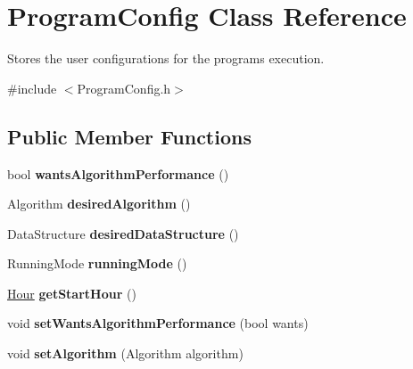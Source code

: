 \hypertarget{class_program_config}{}\section{Program\+Config Class Reference}
\label{class_program_config}


Stores the user configurations for the program\textquotesingle{}s execution.  




{\ttfamily \#include $<$Program\+Config.\+h$>$}

\subsection*{Public Member Functions}
\begin{DoxyCompactItemize}
\item 
\hypertarget{class_program_config_a518cb5f9a8c0a7470ea51b218cb9e2f3}{}bool {\bfseries wants\+Algorithm\+Performance} ()\label{class_program_config_a518cb5f9a8c0a7470ea51b218cb9e2f3}

\item 
\hypertarget{class_program_config_ae95569a91e2202d5ab11695af1a57620}{}Algorithm {\bfseries desired\+Algorithm} ()\label{class_program_config_ae95569a91e2202d5ab11695af1a57620}

\item 
\hypertarget{class_program_config_ae4d324614f4ce6918689c2d9bedb4548}{}Data\+Structure {\bfseries desired\+Data\+Structure} ()\label{class_program_config_ae4d324614f4ce6918689c2d9bedb4548}

\item 
\hypertarget{class_program_config_a5294986dc3d06899c9e75167e8296e83}{}Running\+Mode {\bfseries running\+Mode} ()\label{class_program_config_a5294986dc3d06899c9e75167e8296e83}

\item 
\hypertarget{class_program_config_a785a49f77c7eff93c43a82d1cac4973d}{}\hyperlink{class_hour}{Hour} {\bfseries get\+Start\+Hour} ()\label{class_program_config_a785a49f77c7eff93c43a82d1cac4973d}

\item 
\hypertarget{class_program_config_a6f2ba674157caea3c2d9bc20f1d6b46d}{}void {\bfseries set\+Wants\+Algorithm\+Performance} (bool wants)\label{class_program_config_a6f2ba674157caea3c2d9bc20f1d6b46d}

\item 
\hypertarget{class_program_config_a51efcb092f033936a1529f6903412bba}{}void {\bfseries set\+Algorithm} (Algorithm algorithm)\label{class_program_config_a51efcb092f033936a1529f6903412bba}


\end{DoxyCompactItemize}
